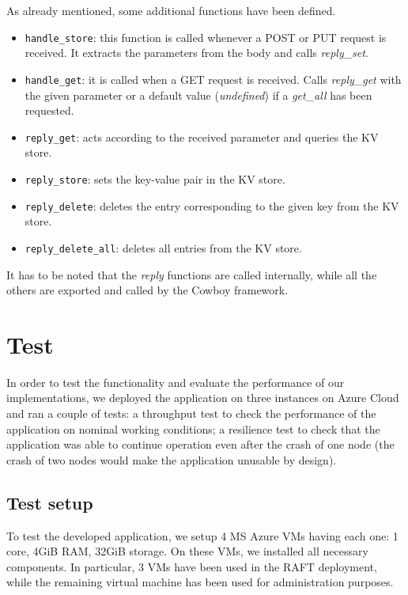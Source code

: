 \documentclass[a4paper]{article}
\begin{document}
As already mentioned, some additional functions have been defined. 
\begin{itemize}
    \item \texttt{handle\_store}: this function is called whenever a POST or
        PUT request is received. It extracts the parameters from the
        body and calls \emph{reply\_set}.
    \item \texttt{handle\_get}: it is called when a GET request is received.
        Calls \emph{reply\_get} with the given parameter or a default value
        (\emph{undefined}) if a \emph{get\_all} has been requested.
    \item \texttt{reply\_get}: acts according to the received parameter and queries
        the KV store.
    \item \texttt{reply\_store}: sets the key-value pair in the KV store.
    \item \texttt{reply\_delete}: deletes the entry corresponding to the given key
        from the KV store.
    \item \texttt{reply\_delete\_all}: deletes all entries from the KV store.
\end{itemize}

It has to be noted that the \emph{reply} functions are called internally,
     while all the others are exported and called by the Cowboy framework.


\section{Test}
In order to test the functionality and evaluate the performance of our 
implementations, we deployed the application on three instances on Azure Cloud 
and ran a couple of tests: 
a throughput test to check the performance of the application on nominal 
working conditions; 
a resilience test to check that the application was able to continue
operation even after the crash of one node (the crash of two nodes would make 
the application unusable by design).

\subsection{Test setup}
To test the developed application, we setup 4 MS Azure VMs having each one:
1 core, 4GiB RAM, 32GiB storage. On these VMs, we installed all necessary 
components. In particular, 3 VMs have been used in the RAFT deployment, while
the remaining virtual machine has been used for administration purposes.
\end{document}
